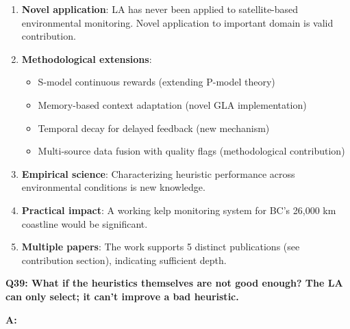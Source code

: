 \documentclass[11pt]{article}
\begin{document}
\begin{enumerate}
    \item \textbf{Novel application}: LA has never been applied to satellite-based environmental monitoring. Novel application to important domain is valid contribution.

    \item \textbf{Methodological extensions}:
    \begin{itemize}
        \item S-model continuous rewards (extending P-model theory)
        \item Memory-based context adaptation (novel GLA implementation)
        \item Temporal decay for delayed feedback (new mechanism)
        \item Multi-source data fusion with quality flags (methodological contribution)
    \end{itemize}

    \item \textbf{Empirical science}: Characterizing heuristic performance across environmental conditions is new knowledge.

    \item \textbf{Practical impact}: A working kelp monitoring system for BC's 26,000 km coastline would be significant.

    \item \textbf{Multiple papers}: The work supports 5 distinct publications (see contribution section), indicating sufficient depth.
\end{enumerate}

\textbf{Q39: What if the heuristics themselves are not good enough? The LA can only select; it can't improve a bad heuristic.}

\textbf{A:}
\end{document}
